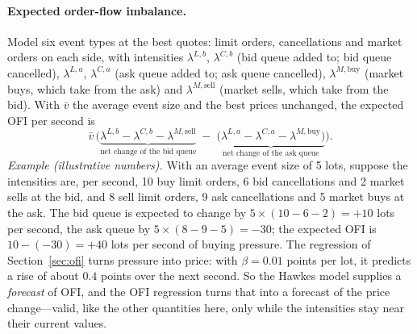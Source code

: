 \paragraph{Expected order-flow imbalance.} Model six event types at the best quotes: limit orders,
cancellations and market orders on each side, with intensities $\lambda^{L,b}$, $\lambda^{C,b}$
(bid queue added to; bid queue cancelled), $\lambda^{L,a}$, $\lambda^{C,a}$ (ask queue added to; ask queue
cancelled), $\lambda^{M,\text{buy}}$ (market buys, which take from the ask) and $\lambda^{M,\text{sell}}$
(market sells, which take from the bid). With $\bar v$ the average event size and the best prices
unchanged, the expected OFI per second is
\[
  \bar v\,\Big( \underbrace{\lambda^{L,b} - \lambda^{C,b} - \lambda^{M,\text{sell}}}_{\text{net change of the bid queue}}
  \;-\; \underbrace{\big(\lambda^{L,a} - \lambda^{C,a} - \lambda^{M,\text{buy}}\big)}_{\text{net change of the ask queue}} \Big).
\]
\textit{Example (illustrative numbers).} With an average event size of 5 lots, suppose the intensities are, per
second, 10 buy limit orders, 6 bid cancellations and 2 market sells at the bid, and 8 sell limit orders, 9 ask
cancellations and 5 market buys at the ask. The bid queue is expected to change by $5 \times (10 - 6 - 2) = +10$
lots per second, the ask queue by $5 \times (8 - 9 - 5) = -30$; the expected OFI is $10 - (-30) = +40$ lots per
second of buying pressure. The regression of Section~\ref{sec:ofi} turns pressure into price: with
$\beta = 0.01$ points per lot, it predicts a rise of about $0.4$ points over the next second. So the Hawkes model
supplies a \emph{forecast} of OFI, and the OFI regression turns that into a forecast of the price change---valid,
like the other quantities here, only while the intensities stay near their current values.

